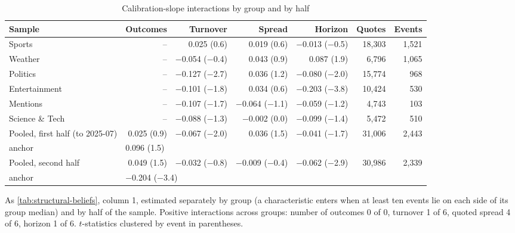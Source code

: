 \begin{table}[!htbp]
\centering
\begin{threeparttable}
\caption{Calibration-slope interactions by group and by half}\label{tab:structural-beliefs-groups}
\scriptsize
\setlength{\tabcolsep}{3.5pt}
\begin{tabular}{@{}lrrrrrr@{}}
\toprule
Sample & Outcomes & Turnover & Spread & Horizon & Quotes & Events \\
\midrule
Sports & -- & 0.025 (0.6) & 0.019 (0.6) & $-$0.013 ($-$0.5) & 18{,}303 & 1{,}521 \\
Weather & -- & $-$0.054 ($-$0.4) & 0.043 (0.9) & 0.087 (1.9) & 6{,}796 & 1{,}065 \\
Politics & -- & $-$0.127 ($-$2.7) & 0.036 (1.2) & $-$0.080 ($-$2.0) & 15{,}774 & 968 \\
Entertainment & -- & $-$0.101 ($-$1.8) & 0.034 (0.6) & $-$0.203 ($-$3.8) & 10{,}424 & 530 \\
Mentions & -- & $-$0.107 ($-$1.7) & $-$0.064 ($-$1.1) & $-$0.059 ($-$1.2) & 4{,}743 & 103 \\
Science \& Tech & -- & $-$0.088 ($-$1.3) & $-$0.002 (0.0) & $-$0.099 ($-$1.4) & 5{,}472 & 510 \\
\midrule
Pooled, first half (to 2025-07) & 0.025 (0.9) & $-$0.067 ($-$2.0) & 0.036 (1.5) & $-$0.041 ($-$1.7) & 31{,}006 & 2{,}443 \\
\quad anchor & \multicolumn{4}{l}{0.096 (1.5)} & & \\
Pooled, second half & 0.049 (1.5) & $-$0.032 ($-$0.8) & $-$0.009 ($-$0.4) & $-$0.062 ($-$2.9) & 30{,}986 & 2{,}339 \\
\quad anchor & \multicolumn{4}{l}{$-$0.204 ($-$3.4)} & & \\
\bottomrule
\end{tabular}
\begin{tablenotes}\footnotesize
\item As \cref{tab:structural-beliefs}, column 1, estimated separately by group (a characteristic enters when at least ten events lie on each side of its group median) and by half of the sample. Positive interactions across groups: number of outcomes 0 of 0, turnover 1 of 6, quoted spread 4 of 6, horizon 1 of 6. $t$-statistics clustered by event in parentheses.
\end{tablenotes}
\end{threeparttable}
\end{table}


